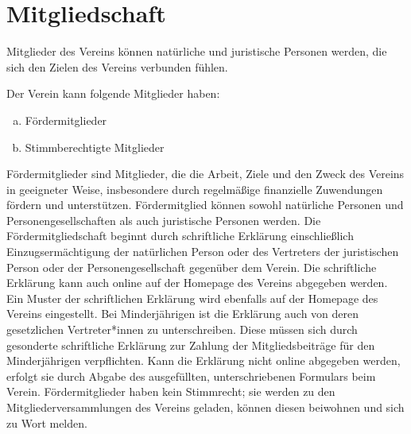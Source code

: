 \section{Mitgliedschaft}
\begin{contract}

    Mitglieder des Vereins können natürliche und juristische Personen werden, die sich den Zielen des Vereins verbunden fühlen.

    Der Verein kann folgende Mitglieder haben:
    \begin{enumerate}[(a)]
        \item Fördermitglieder
        \item Stimmberechtigte Mitglieder
    \end{enumerate}


    Fördermitglieder sind Mitglieder, die die Arbeit, Ziele und den Zweck des Vereins in geeigneter Weise, insbesondere durch regelmäßige finanzielle Zuwendungen fördern und unterstützen. Fördermitglied können sowohl natürliche Personen und Personengesellschaften als auch juristische Personen werden. Die Fördermitgliedschaft beginnt durch schriftliche Erklärung einschließlich Einzugsermächtigung der natürlichen Person oder des Vertreters der juristischen Person oder der Personengesellschaft gegenüber dem Verein. Die schriftliche Erklärung kann auch online auf der Homepage des Vereins abgegeben werden. Ein Muster der schriftlichen Erklärung wird ebenfalls auf der Homepage des Vereins eingestellt. Bei  Minderjährigen ist die Erklärung auch von deren gesetzlichen Vertreter*innen zu unterschreiben. Diese müssen sich durch gesonderte schriftliche Erklärung zur Zahlung der Mitgliedsbeiträge für den Minderjährigen verpflichten. Kann die Erklärung nicht online abgegeben werden, erfolgt sie durch Abgabe des ausgefüllten, unterschriebenen Formulars beim Verein. Fördermitglieder haben kein Stimmrecht; sie werden zu den Mitgliederversammlungen des Vereins geladen, können diesen beiwohnen und sich zu Wort melden.


\end{contract}
